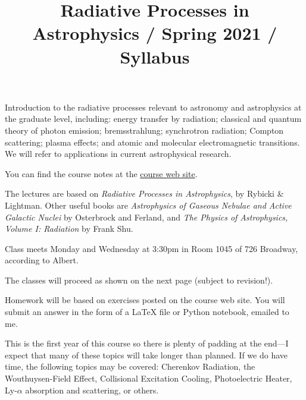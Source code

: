 \documentclass[11pt, preprint]{aastex}
\begin{document}
\title{\bf Radiative Processes in Astrophysics / Spring 2021 / Syllabus }

\noindent Introduction to the radiative processes relevant to astronomy and
astrophysics at the graduate level, including: energy transfer by
radiation; classical and quantum theory of photon emission;
bremsstrahlung; synchrotron radiation; Compton scattering; plasma
effects; and atomic and molecular electromagnetic transitions.  We
will refer to applications in current astrophysical research.

\noindent You can find the course notes at the
\href{http://blanton144.github.io/radiative}{course web site}. 

\noindent The lectures are based on {\it Radiative Processes in
  Astrophysics}, by Rybicki \& Lightman. Other useful books are {\it
  Astrophysics of Gaseous Nebulae and Active Galactic Nuclei} by
Osterbrock and Ferland, and {\it The Physics of Astrophysics, Volume
  I: Radiation} by Frank Shu. 

\noindent Class meets Monday and Wednesday at 3:30pm in Room 1045 of
726 Broadway, according to Albert.

\noindent The classes will proceed as shown on the next page (subject
to revision!).

\noindent 
Homework will be based on exercises posted on the course web site.
You will submit an answer in the form of a LaTeX file or Python
notebook, emailed to me.

\noindent 
This is the first year of this course so there is plenty of padding at
the end---I expect that many of these topics will take longer than
planned. If we do have time, the following topics may be covered:
Cherenkov Radiation, the Wouthuysen-Field Effect, Collisional
Excitation Cooling, Photoelectric Heater, Ly-$\alpha$ absorption and
scattering, or others.
\end{document}
